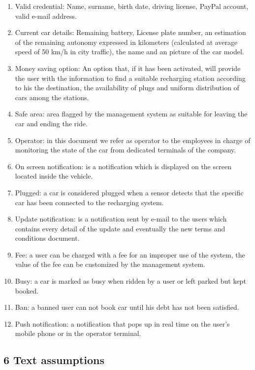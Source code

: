 \documentclass[]{article}
\providecommand{\tightlist}{%
  \setlength{\itemsep}{0pt}\setlength{\parskip}{0pt}}
\begin{document}
\begin{enumerate}
\def\labelenumi{\arabic{enumi}.}
\tightlist
\item
  Valid credential: Name, surname, birth date, driving license, PayPal
  account, valid e-mail address.
\item
  Current car details: Remaining battery, License plate number, an
  estimation of the remaining autonomy expressed in kilometers
  (calculated at average speed of 50 km/h in city traffic), the name and
  an picture of the car model.
\item
  Money saving option: An option that, if it has been activated, will
  provide the user with the information to find a suitable recharging
  station according to his the destination, the availability of plugs
  and uniform distribution of cars among the stations.
\item
  Safe area: area flagged by the management system as suitable for
  leaving the car and ending the ride.
\item
  Operator: in this document we refer as operator to the employees in
  charge of monitoring the state of the car from dedicated terminals of
  the company.
\item
  On screen notification: is a notification which is displayed on the
  screen located inside the vehicle.
\item
  Plugged: a car is considered plugged when a sensor detects that the
  specific car has been connected to the recharging system.
\item
  Update notification: is a notification sent by e-mail to the users
  which contains every detail of the update and eventually the new terms
  and conditions document.
\item
  Fee: a user can be charged with a fee for an improper use of the
  system, the value of the fee can be customized by the management
  system.
\item
  Busy: a car is marked as busy when ridden by a user or left parked but
  kept booked.
\item
  Ban: a banned user can not book car until his debt has not been
  satisfied.
\item
  Push notification: a notification that pops up in real time on the
  user's mobile phone or in the operator terminal.
\end{enumerate}

\subsection{6 Text assumptions}\label{text-assumptions}
\end{document}
